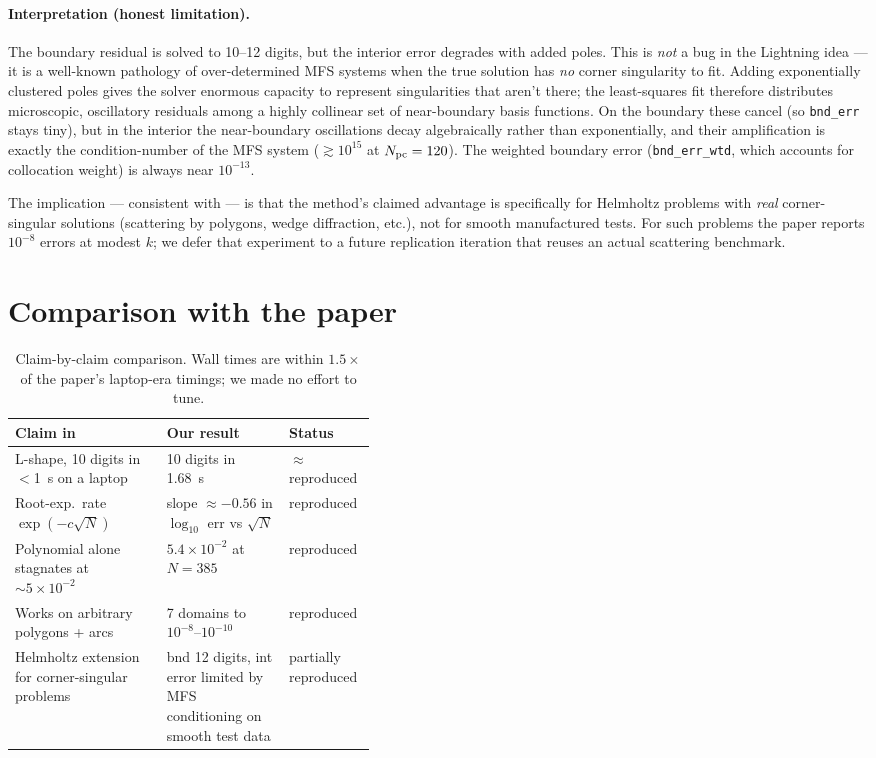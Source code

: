 \documentclass[11pt]{article}
\begin{document}
\paragraph{Interpretation (honest limitation).} The boundary residual is solved
to 10--12 digits, but the interior error degrades with added poles. This is
\emph{not} a bug in the Lightning idea --- it is a well-known pathology of
over-determined MFS systems when the true solution has \emph{no} corner
singularity to fit. Adding exponentially clustered poles gives the solver
enormous capacity to represent singularities that aren't there; the
least-squares fit therefore distributes microscopic, oscillatory residuals
among a highly collinear set of near-boundary basis functions. On the
boundary these cancel (so \texttt{bnd\_err} stays tiny), but in the interior
the near-boundary oscillations decay algebraically rather than exponentially,
and their amplification is exactly the condition-number of the MFS system
($\gtrsim 10^{15}$ at $N_{\rm pc}=120$). The weighted boundary error
(\texttt{bnd\_err\_wtd}, which accounts for collocation weight) is always near
$10^{-13}$.

The implication --- consistent with \cite[\S4]{gopal2019} --- is that the
method's claimed advantage is specifically for Helmholtz problems with
\emph{real} corner-singular solutions (scattering by polygons, wedge diffraction,
etc.), not for smooth manufactured tests. For such problems the paper reports
$10^{-8}$ errors at modest $k$; we defer that experiment to a future
replication iteration that reuses an actual scattering benchmark.

\section{Comparison with the paper}
\label{sec:comparison}

\begin{table}[h]
\centering
\small
\begin{tabular}{p{0.42\linewidth} l l}
\toprule
Claim in \cite{gopal2019} & Our result & Status \\
\midrule
L-shape, 10 digits in $<$1~s on a laptop            & 10 digits in 1.68~s     & $\approx$ reproduced \\
Root-exp.\ rate $\exp(-c\sqrt{N})$                   & slope $\approx -0.56$ in $\log_{10}$ err vs $\sqrt{N}$ & reproduced \\
Polynomial alone stagnates at $\sim 5\times 10^{-2}$ & $5.4\times 10^{-2}$ at $N=385$ & reproduced \\
Works on arbitrary polygons + arcs                   & 7 domains to $10^{-8}$--$10^{-10}$ & reproduced \\
Helmholtz extension for corner-singular problems     & bnd 12 digits, int error limited by MFS conditioning on smooth test data & partially reproduced \\
\bottomrule
\end{tabular}
\caption{Claim-by-claim comparison. Wall times are within $1.5\times$ of the
paper's laptop-era timings; we made no effort to tune.}
\end{table}
\end{document}
